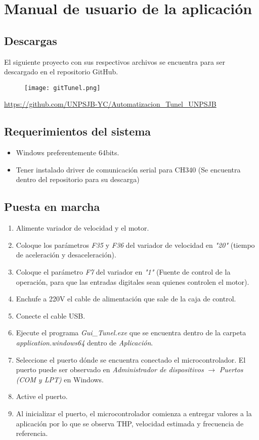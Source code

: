 \newpage






\section{Manual de usuario de la aplicación}
\subsection{Descargas}
El siguiente proyecto con sus respectivos archivos se encuentra para ser descargado en el repositorio GitHub.
\begin{figure}[htb]
	\centering
	\texttt{[image: gitTunel.png]}
	\label{fig:git}
\end{figure}

\url{https://github.com/UNPSJB-YC/Automatizacion_Tunel_UNPSJB}

\subsection{Requerimientos del sistema}
\begin{itemize}
	\item Windows preferentemente 64bits.
	\item Tener instalado driver de comunicación serial para CH340 (Se encuentra dentro del repositorio para su descarga) 
\end{itemize}


\subsection{Puesta en marcha}
\begin{enumerate}
	\item Alimente variador de velocidad y el motor.
	\item Coloque los parámetros \textit{F35} y \textit{F36} del variador de velocidad en \textit{"20"} (tiempo de aceleración y desaceleración).
	\item Coloque el parámetro \textit{F7} del variador en \textit{"1"} (Fuente de control de la operación, para que las entradas digitales sean quienes controlen el motor).
	\item Enchufe a 220V el cable de alimentación que sale de la caja de control.
	\item Conecte el cable USB.
	\item Ejecute el programa \textit{Gui\_Tunel.exe} que se encuentra dentro de la carpeta \textit{application.windows64} dentro de \textit{Aplicación}.
	\item Seleccione el puerto dónde se encuentra conectado el microcontrolador.
	\subitem El puerto puede ser observado en \textit{Administrador de dispositivos} $\rightarrow$ \textit{Puertos (COM y LPT)} en Windows.
	\item Active el puerto.
	\item Al inicializar el puerto, el microcontrolador comienza a entregar valores a la aplicación por lo que se observa THP, velocidad estimada y frecuencia de referencia. 
	
\end{enumerate}

